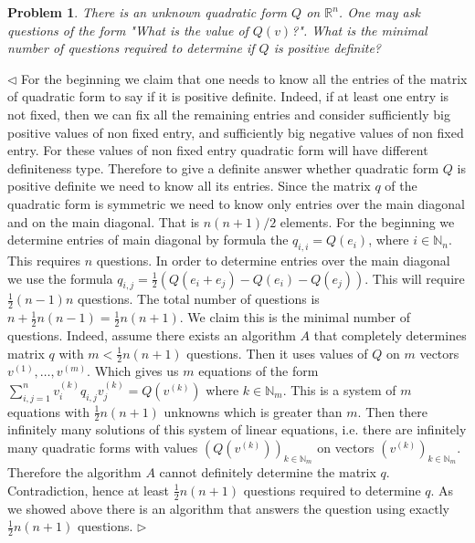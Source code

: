 \documentclass[12pt]{article}
\newtheorem{problem}{Problem}[subsection]
\newenvironment{solution}{\par $\triangleleft$}{$\triangleright$}
\begin{document}
\begin{problem} There is an unknown quadratic form $Q$ on $\mathbb{R}^n$. One may ask questions of the form "What is the value of $Q(v)$?". What is the minimal number of questions required to determine if $Q$ is positive definite?
\end{problem}
\begin{solution} For the beginning we claim that one needs to know all the entries of the matrix of quadratic form to say if it is positive definite. Indeed, if at least one entry is not fixed, then we can fix all the remaining entries and consider sufficiently big positive values of non fixed entry, and sufficiently big negative values of non fixed entry. For these values of non fixed entry quadratic form will have different definiteness type. Therefore to give a definite answer whether quadratic form $Q$ is positive definite we need to know all its entries. Since the matrix $q$ of the quadratic form is symmetric we need to know only entries over the main diagonal and on the main diagonal. That is $n(n+1)/2$ elements. For the beginning we determine entries of main diagonal by formula the $q_{i,i}=Q(e_i)$, where $i\in\mathbb{N}_n$. This requires $n$ questions. In order to  determine entries over the main diagonal we use the formula $q_{i,j}=\frac{1}{2}(Q(e_i+e_j)-Q(e_i)-Q(e_j))$. This will require $\frac{1}{2}(n-1)n$ questions. The total number of questions is $n+\frac{1}{2}n(n-1)=\frac{1}{2}n(n+1)$. We claim this is the minimal number of questions. Indeed, assume there exists an algorithm $A$ that completely determines matrix $q$ with $m<\frac{1}{2}n(n+1)$ questions. Then it uses values of $Q$ on $m$ vectors $v^{(1)},\ldots,v^{(m)}$. Which gives us $m$ equations of the form $\sum_{i,j=1}^n v_i^{(k)}q_{i,j}v_j^{(k)}=Q(v^{(k)})$ where $k\in\mathbb{N}_m$. This is a system of $m$ equations with $\frac{1}{2}n(n+1)$ unknowns which is greater than $m$. Then there infinitely many solutions of this system of linear equations, i.e. there are infinitely many quadratic forms with values $(Q(v^{(k)}))_{k\in\mathbb{N}_m}$ on vectors $(v^{(k)})_{k\in\mathbb{N}_m}$. Therefore the algorithm $A$ cannot definitely determine the matrix $q$. Contradiction, hence at least $\frac{1}{2}n(n+1)$ questions required to determine $q$. As we showed above there is an algorithm that answers the question using exactly $\frac{1}{2}n(n+1)$ questions.
\end{solution}
 
 
 
 
 
\end{document}
